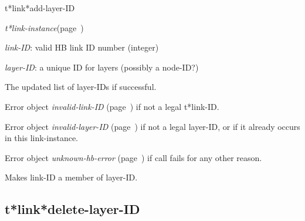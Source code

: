 \begin{description}
\item [Name:]  t*link*add-layer-ID

\item [Class:] {\sl t*link-instance}\hfill(page~\pageref{t*link-instance})

\item [Parameters:]
\item {\sl link-ID}:  
valid HB link ID number (integer)

\item {\sl layer-ID}:  a unique ID for layers (possibly a node-ID?)



\item [Return-value:]
The updated list of layer-IDs if successful.

Error object {\sl invalid-link-ID} (page~\pageref{invalid-link-ID}) if not a legal
t*link-ID.

Error object {\sl invalid-layer-ID} (page~\pageref{invalid-layer-ID}) if not a legal
layer-ID, or if it already occurs in this link-instance.

Error object {\sl unknown-hb-error} (page~\pageref{unknown-hb-error}) if call fails
for any other reason.

\item [Description:]

Makes link-ID a member of layer-ID.

\item [Public:]



\end{description}
\horizontalline

\subsection{t*link*delete-layer-ID}
\label{t*link*delete-layer-ID}

